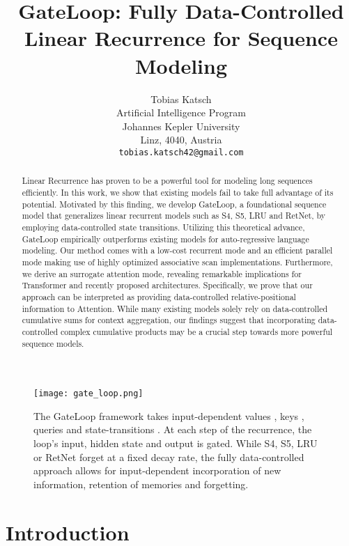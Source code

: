 \documentclass{article} \usepackage{iclr2024_conference,times}
\title{GateLoop: Fully Data-Controlled Linear Recurrence for Sequence Modeling}
\author{Tobias Katsch \\
Artificial Intelligence Program \\
Johannes Kepler University \\
Linz, 4040, Austria \\
\texttt{tobias.katsch42@gmail.com} \\
}
\begin{document}
\maketitle

\begin{abstract}
Linear Recurrence has proven to be a powerful tool for modeling long sequences efficiently. In this work, we show that existing models fail to take full advantage of its potential. Motivated by this finding, we develop GateLoop, a foundational sequence model that generalizes linear recurrent models such as S4, S5, LRU and RetNet, by employing data-controlled state transitions. 
Utilizing this theoretical advance, GateLoop empirically outperforms existing models for auto-regressive language modeling. Our method comes with a low-cost  recurrent mode and an efficient  parallel mode making use of highly optimized associative scan implementations. Furthermore, we derive an  surrogate attention mode, revealing remarkable implications for Transformer and recently proposed architectures. 
Specifically, we prove that our approach can be interpreted as providing data-controlled relative-positional information to Attention. 
While many existing models solely rely on data-controlled cumulative sums for context aggregation, our findings suggest that incorporating data-controlled complex cumulative products may be a crucial step towards more powerful sequence models.
\end{abstract}

\begin{figure}[H]
\begin{center}
\texttt{[image: gate\_loop.png]}
\end{center}
\caption{The GateLoop framework takes input-dependent values , keys , queries  and state-transitions . At each step of the recurrence, the loop's input, hidden state and output is gated. While S4, S5, LRU or RetNet forget at a fixed decay rate, the fully data-controlled approach allows for input-dependent incorporation of new information, retention of memories and forgetting. }

\end{figure}

\section{Introduction}
\end{document}
